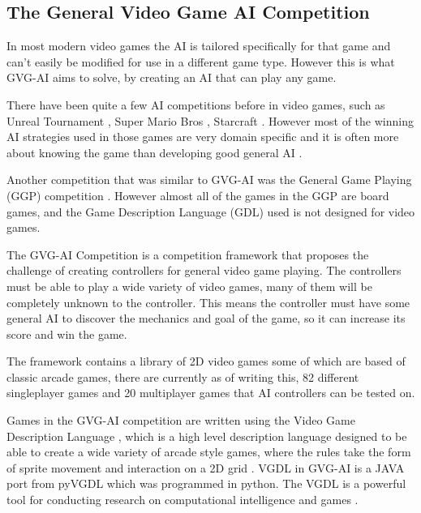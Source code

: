 \documentclass[journal]{IEEEtran}
\begin{document}
			
		
		

	\subsection{The General Video Game AI Competition} \label{ssec:GVGAIC}
	
		In most modern video games the AI is tailored specifically for that game and can't easily be modified for use in a different game type. However this is what GVG-AI aims to solve, by creating an AI that can play any game. 
		
		There have been quite a few AI competitions before in video games, such as Unreal Tournament \cite{hingston2010new}, Super Mario Bros \cite{shaker2013turing}, Starcraft \cite{ontanon2013survey}. 
		However most of the winning AI strategies used in those games are very domain specific and it is often more about knowing the game than developing good general AI \cite{perez20162014}. 
		 \par
		
		
		Another competition that was similar to GVG-AI was the General Game Playing (GGP) competition \cite{GGP2005general, love2008general}. However almost all of the games in the GGP are board games, and the Game Description Language (GDL) used is not designed for video games.
		
		The GVG-AI Competition is a competition framework that proposes the challenge of creating controllers for general video game playing. The controllers must be able to play a wide variety of video games, many of them will be completely unknown to the controller. This means the controller must have some general AI to discover the mechanics and goal of the game, so it can increase its score and win the game. \cite{GVGAI, perez20162014}
		
		The framework contains a library of 2D video games some of which are based of classic arcade games, there are currently as of writing this, 82 different singleplayer games and 20 multiplayer games that AI controllers can be tested on.
		
		Games in the GVG-AI competition are written using the Video Game Description Language \cite{schaul2014extensible}, which is a high level description language designed to be able to create a wide variety of arcade style games, where the rules take the form of sprite movement and interaction on a 2D grid \cite{nelson2016investigating}.
		VGDL in GVG-AI is a JAVA port from pyVGDL which was programmed in python. The VGDL is a powerful tool for conducting research on computational intelligence and games \cite{schaul2014extensible, love2008general}.
\end{document}
